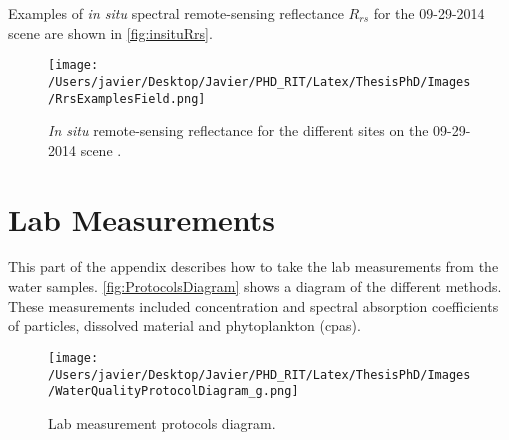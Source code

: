 \begin{appendices}
Examples of {\it in situ} spectral remote-sensing reflectance $R_{rs}$ for the 09-29-2014 scene are shown in \autoref{fig:insituRrs}.

\begin{figure}[htbp!]
      \centering
      \texttt{[image: /Users/javier/Desktop/Javier/PHD\_RIT/Latex/ThesisPhD/Images/RrsExamplesField.png]}  
      \caption[{\it In situ} remote-sensing reflectance for the 09-29-2014 scene]{{\it In situ} remote-sensing reflectance for the different sites on the 09-29-2014 scene . \label{fig:insituRrs}}
\end{figure}





\chapter{Lab Measurements}
\label{ch:labmea} 

This part of the appendix describes how to take the lab measurements from the water samples. \autoref{fig:ProtocolsDiagram} shows a diagram of the different methods. These measurements included concentration and spectral absorption coefficients of particles, dissolved material and phytoplankton (\gls{cpas}).


\begin{figure}[htb]
\centering
    \texttt{[image: /Users/javier/Desktop/Javier/PHD\_RIT/Latex/ThesisPhD/Images/WaterQualityProtocolDiagram\_g.png]}%
    \vspace{0.5cm}
   \caption[]{\label{fig:ProtocolsDiagram} Lab measurement protocols diagram.}
\end{figure}


\end{appendices}
